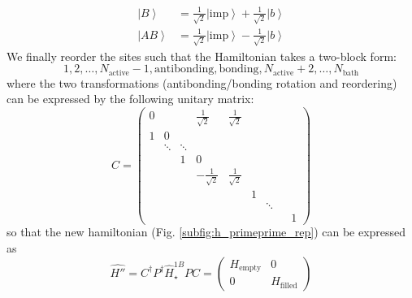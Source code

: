 \documentclass[11pt]{article}
\newcommand{\hamiltonian}{\hat{H}}
\newcommand{\ket}[1]{\left| {#1} \right>}
\newcommand{\bath}{\text{bath}}
\newcommand{\imp}{\text{imp}}
\newcommand{\empti}{\text{empty}}
\newcommand{\filled}{\text{filled}}
\newcommand{\activ}{\text{active}}
\begin{document}
\begin{align}
\ket{B} & = \frac{1}{\sqrt{2}}\ket{\imp} + \frac{1}{\sqrt{2}}\ket{b}\\
\ket{AB} & = \frac{1}{\sqrt{2}}\ket{\imp} - \frac{1}{\sqrt{2}}\ket{b}
\end{align}
We finally reorder the sites such that the Hamiltonian takes a two-block form:
\begin{equation}
1, 2, \ldots, N_\activ-1, \text{antibonding}, \text{bonding}, N_\activ+2, \ldots, N_\bath
\end{equation}
where the two transformations (antibonding/bonding rotation and reordering) can be expressed by the following unitary matrix:
\begin{equation}\label{eq:bab_rotation}
C =
\begin{pmatrix}
0 & & & \frac{1}{\sqrt{2}}& \frac{1}{\sqrt{2}}  & & &\\
1 & 0 & & & & & &\\
  & \ddots & \ddots & & & & &\\
  & & 1 & 0 & & & &\\
  & & & -\frac{1}{\sqrt{2}}& \frac{1}{\sqrt{2}}& & & &\\
  & & & & & 1 & & &\\
  & & & & & &  \ddots& &\\
  & & & & & &  & &1
\end{pmatrix}
\end{equation}
so that the new hamiltonian (Fig. \ref{subfig:h_primeprime_rep}) can be expressed as
\begin{equation}
\hat{H''}=C^\dagger P^\dagger \hamiltonian_\star^{1B} PC = 
\begin{pmatrix}
	H_\empti & 0 \\
	0 & H_\filled
\end{pmatrix}
\end{equation}
\end{document}
